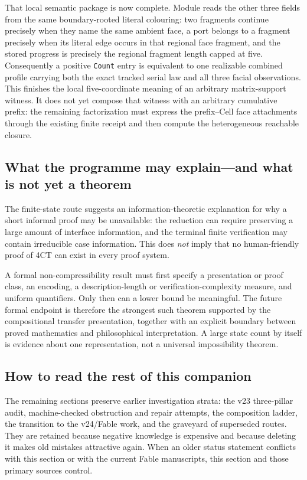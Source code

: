 \documentclass[11pt]{article}
\theoremstyle{definition}
\begin{document}
That local semantic package is now complete.  Module
reads the other three fields from the same boundary-rooted literal colouring:
two fragments continue precisely when they name the same ambient face, a port
belongs to a fragment precisely when its literal edge occurs in that regional
face fragment, and the stored progress is precisely the regional fragment
length capped at five.  Consequently a positive \texttt{Count} entry is
equivalent to one realizable combined profile carrying both the exact tracked
serial law and all three facial observations.  This finishes the local
five-coordinate meaning of an arbitrary matrix-support witness.  It does not
yet compose that witness with an arbitrary cumulative prefix: the remaining
factorization must express the prefix--Cell face attachments through the
existing finite receipt and then compute the heterogeneous reachable closure.

\subsection{What the programme may explain---and what is not yet a theorem}

The finite-state route suggests an information-theoretic explanation for why a
short informal proof may be unavailable: the reduction can require preserving
a large amount of interface information, and the terminal finite verification
may contain irreducible case information.  This does \emph{not} imply that no
human-friendly proof of 4CT can exist in every proof system.

A formal non-compressibility result must first specify a presentation or proof
class, an encoding, a description-length or verification-complexity measure,
and uniform quantifiers.  Only then can a lower bound be meaningful.  The
future formal endpoint is therefore the strongest such theorem supported by
the compositional transfer presentation, together with an explicit boundary
between proved mathematics and philosophical interpretation.  A large state
count by itself is evidence about one representation, not a universal
impossibility theorem.

\subsection{How to read the rest of this companion}

The remaining sections preserve earlier investigation strata: the v23
three-pillar audit, machine-checked obstruction and repair attempts, the
composition ladder, the transition to the v24/Fable work, and the graveyard of
superseded routes.  They are retained because negative knowledge is expensive
and because deleting it makes old mistakes attractive again.  When an older
status statement conflicts with this section or with the current Fable
manuscripts, this section and those primary sources control.
\end{document}
